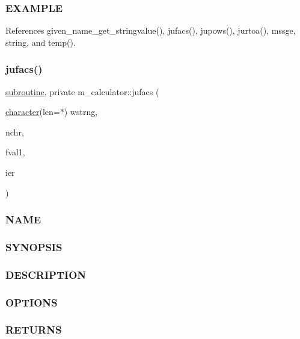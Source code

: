 \subsubsection*{E\+X\+A\+M\+P\+LE}

References given\+\_\+name\+\_\+get\+\_\+stringvalue(), jufacs(), jupows(), jurtoa(), mssge, string, and temp().

\mbox{\label{namespacem__calculator_a78c73098f0fcf1130ea9f5f3748bef7d}} 
\subsubsection{\texorpdfstring{jufacs()}{jufacs()}}
{\footnotesize\ttfamily \hyperlink{M__stopwatch_83_8txt_acfbcff50169d691ff02d4a123ed70482}{subroutine}, private m\+\_\+calculator\+::jufacs (\begin{DoxyParamCaption}\item[{\hyperlink{option__stopwatch_83_8txt_abd4b21fbbd175834027b5224bfe97e66}{character}(len=$\ast$)}]{wstrng,  }\item[{}]{nchr,  }\item[{}]{fval1,  }\item[{}]{ier }\end{DoxyParamCaption})\hspace{0.3cm}{\ttfamily [private]}}



\subsubsection*{N\+A\+ME}

\subsubsection*{S\+Y\+N\+O\+P\+S\+IS}

\subsubsection*{D\+E\+S\+C\+R\+I\+P\+T\+I\+ON}

\subsubsection*{O\+P\+T\+I\+O\+NS}

\subsubsection*{R\+E\+T\+U\+R\+NS}

